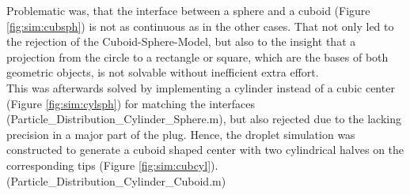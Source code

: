 Problematic was, that the interface between a sphere and a cuboid (Figure \ref{fig:sim:cubsph}) is not as continuous as in the other cases. That not only led to the rejection of the Cuboid-Sphere-Model, but also to the insight that a projection from the circle to a rectangle or square, which are the bases of both geometric objects, is not solvable without inefficient extra effort.\\
This was afterwards solved by implementing a cylinder instead of a cubic center (Figure \ref{fig:sim:cylsph}) for matching the interfaces (Particle\_Distribution\_Cylinder\_Sphere.m), but also rejected due to the lacking precision in a major part of the plug.
Hence, the droplet simulation was constructed to generate a cuboid shaped center with two cylindrical halves on the corresponding tips (Figure \ref{fig:sim:cubcyl}). (Particle\_Distribution\_Cylinder\_Cuboid.m)

